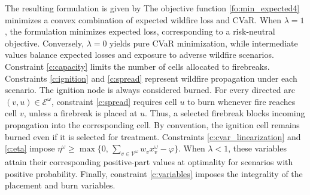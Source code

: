\documentclass{itor}
\begin{document}
The resulting formulation is given by
The objective function \eqref{fo:min_expected4} minimizes
a convex combination of expected wildfire loss and CVaR.
When $\lambda=1$, the formulation minimizes expected loss,
corresponding to a risk-neutral objective. Conversely,
$\lambda=0$ yields pure CVaR minimization, while intermediate
values balance expected losses and exposure to adverse
wildfire scenarios. Constraint \eqref{c:capacity} limits the number of cells
allocated to firebreaks. Constraints \eqref{c:ignition}
and \eqref{c:spread} represent wildfire propagation
under each scenario. The ignition node is always considered
burned. For every directed arc
$(v,u)\in\mathcal{E}^\omega$, constraint
\eqref{c:spread} requires cell $u$ to burn whenever
fire reaches cell $v$, unless a firebreak is placed
at $u$. Thus, a selected firebreak blocks incoming
propagation into the corresponding cell. By convention,
the ignition cell remains burned even if it is
selected for treatment. Constraints \eqref{c:cvar_linearization} and
\eqref{c:eta} impose
$\eta^\omega\geq
\max\{
0,\,
\sum_{v\in\mathcal{V}^\omega}
w_vx_v^\omega-\varphi
\}$. When $\lambda<1$, these variables attain their
corresponding positive-part values at optimality
for scenarios with positive probability.
Finally, constraint \eqref{c:variables} imposes
the integrality of the placement and burn variables.
\end{document}
